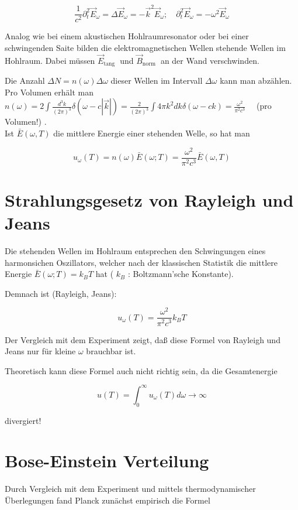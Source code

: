 \documentclass[10pt, letterpaper]{article}
\begin{document}
$$
\frac{1}{c^{2}} \partial_{t}^{2} \vec{E}_{\omega}=\Delta \vec{E}_{\omega}=-\vec{k}^{2} \vec{E}_{\omega} ; \quad \partial_{t}^{2} \vec{E}_{\omega}=-\omega^{2} \vec{E}_{\omega}
$$

Analog wie bei einem akustischen Hohlraumresonator oder bei einer schwingenden Saite bilden die elektromagnetischen Wellen stehende Wellen im Hohlraum. Dabei müssen $\vec{E}_{\text {tang }}$ und $\vec{B}_{\text {norm }}$ an der Wand verschwinden.

Die Anzahl $\Delta N=n(\omega) \Delta \omega$ dieser Wellen im Intervall $\Delta \omega$ kann man abzählen. Pro Volumen erhält man\\
$n(\omega)=2 \int \frac{d^{3} k}{(2 \pi)^{3}} \delta(\omega-c|\vec{k}|)=\frac{2}{(2 \pi)^{3}} \int 4 \pi k^{2} d k \delta(\omega-c k)=\frac{\omega^{2}}{\pi^{2} c^{3}} \quad$ (pro Volumen!) .\\
Ist $\bar{E}(\omega, T)$ die mittlere Energie einer stehenden Welle, so hat man

$$
u_{\omega}(T)=n(\omega) \bar{E}(\omega ; T)=\frac{\omega^{2}}{\pi^{2} c^{3}} \bar{E}(\omega, T)
$$

\section*{Strahlungsgesetz von Rayleigh und Jeans}
Die stehenden Wellen im Hohlraum entsprechen den Schwingungen eines harmonsichen Oszillators, welcher nach der klassischen Statistik die mittlere Energie $\bar{E}(\omega ; T)=k_{B} T$ hat ( $k_{B}$ : Boltzmann'sche Konstante).

Demnach ist (Rayleigh, Jeans):

$$
u_{\omega}(T)=\frac{\omega^{2}}{\pi^{2} c^{3}} k_{B} T
$$

Der Vergleich mit dem Experiment zeigt, daß diese Formel von Rayleigh und Jeans nur für kleine $\omega$ brauchbar ist.

Theoretisch kann diese Formel auch nicht richtig sein, da die Gesamtenergie

$$
u(T)=\int_{0}^{\infty} u_{\omega}(T) d \omega \rightarrow \infty
$$

divergiert!

\section*{Bose-Einstein Verteilung}
Durch Vergleich mit dem Experiment und mittels thermodynamischer Überlegungen fand Planck zunächst empirisch die Formel
\end{document}
